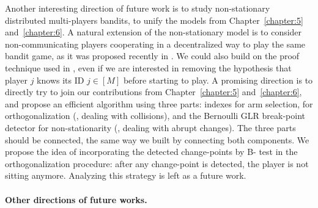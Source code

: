 Another interesting direction of future work is to study non-stationary distributed multi-players bandits, to unify the models from Chapter~\ref{chapter:5} and~\ref{chapter:6}.
A natural extension of the non-stationary model is to consider non-communicating players cooperating in a decentralized way to play the same bandit game, as it was proposed recently in \cite{WeiSrivastava18Distributed}.
%
We could also build on the proof technique used in \cite{WeiSrivastava18Abruptly}, even if we are interested in removing the hypothesis that player $j$ knows its ID $j\in[M]$ before starting to play.
%
A promising direction is to directly try to join our contributions from Chapter~\ref{chapter:5} and~\ref{chapter:6}, and propose an efficient algorithm using three parts:
\klUCB{} indexes for arm selection,
\MCTopM{} for orthogonalization (\ie, dealing with collisions),
and the Bernoulli GLR break-point detector for non-stationarity (\ie, dealing with abrupt changes).
The three parts should be connected, the same way we built \GLRklUCB{} by connecting both components.
We propose the idea of incorporating the detected change-points by B-\GLR{} test in the orthogonalization procedure: after any change-point is detected, the player is not sitting anymore.
Analyzing this strategy is left as a future work.



\paragraph{Other directions of future works.}

